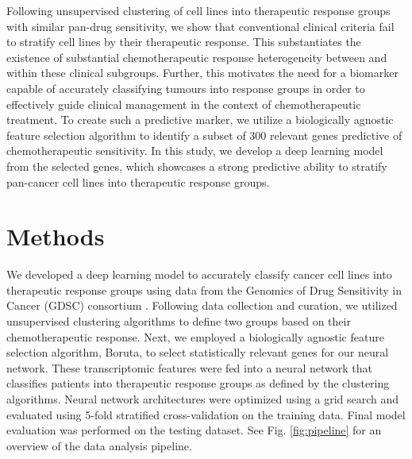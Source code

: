 \documentclass[10pt, letterpaper, twocolumn]{article}
\begin{document}
Following unsupervised clustering of cell lines into therapeutic response groups with similar pan-drug sensitivity, we show that conventional clinical criteria fail to stratify cell lines by their therapeutic response. This substantiates the existence of substantial chemotherapeutic response heterogeneity between and within these clinical subgroups. Further, this motivates the need for a biomarker capable of accurately classifying tumours into response groups in order to effectively guide clinical management in the context of chemotherapeutic treatment. To create such a predictive marker, we utilize a biologically agnostic feature selection algorithm to identify a subset of 300 relevant genes predictive of chemotherapeutic sensitivity. In this study, we develop a deep learning model from the selected genes, which showcases a strong predictive ability to stratify pan-cancer cell lines into therapeutic response groups.


\section{Methods}
We developed a deep learning model to accurately classify cancer cell lines into therapeutic response groups using data from the Genomics of Drug Sensitivity in Cancer (GDSC) consortium \cite{gdsc}. Following data collection and curation, we utilized unsupervised clustering algorithms to define two groups based on their chemotherapeutic response. Next, we employed a biologically agnostic feature selection algorithm, Boruta, to select statistically relevant genes for our neural network. These transcriptomic features were fed into a neural network that classifies patients into therapeutic response groups as defined by the clustering algorithms. Neural network architectures were optimized using a grid search and evaluated using 5-fold stratified cross-validation on the training data. Final model evaluation was performed on the testing dataset. See Fig. \ref{fig:pipeline} for an overview of the data analysis pipeline.
\end{document}
